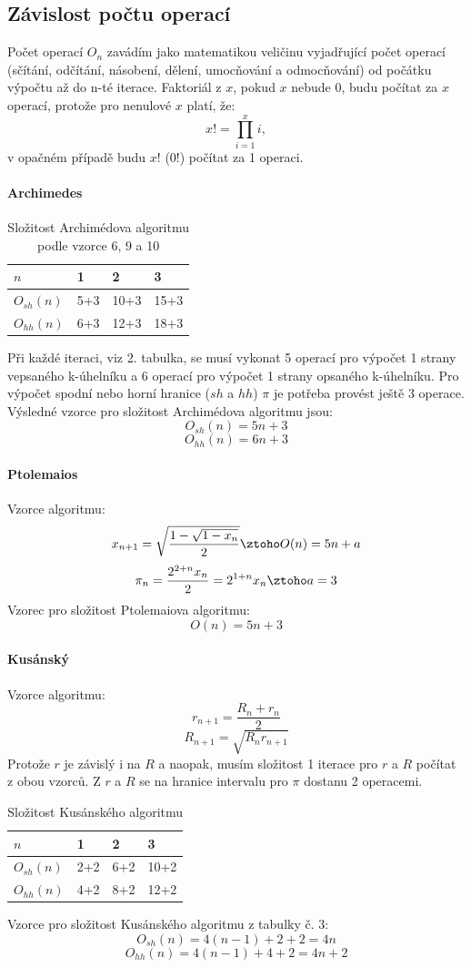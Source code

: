 \documentclass[rocnikovka]{gzwroc} %
\begin{document}
\subsection{Závislost počtu operací}
Počet operací $O_n$ zavádím jako matematikou veličinu vyjadřující počet operací (sčítání, odčítání, násobení, dělení, umocňování a odmocňování) od počátku výpočtu až do n-té iterace. Faktoriál z $x$, pokud $x$ nebude 0, budu počítat za $x$ operací, protože pro nenulové $x$ platí, že:
$$
x!=\prod_{i=1}^{x} i,
$$
v opačném případě budu $x!$ (0!) počítat za 1 operaci.
\paragraph{Archimedes}
\begin{table}[h!]
\caption{Složitost Archimédova algoritmu podle vzorce 6, 9 a 10}
\begin{tabular}{|l||l|l|l|}
\hline
$n$ & 1&2&3 \\ \hline
$O_{sh}(n)$&5+3&10+3&15+3 \\ \hline
$O_{hh}(n)$&6+3&12+3&18+3 \\ \hline
\end{tabular}
\end{table}
Při každé iteraci, viz 2. tabulka, se musí vykonat 5 operací pro výpočet 1 strany vepsaného k-úhelníku a 6 operací pro výpočet 1 strany opsaného k-úhelníku. Pro výpočet spodní nebo horní hranice ($sh$ a $hh$) $\pi$ je potřeba provést ještě 3 operace. Výsledné vzorce pro složitost Archimédova algoritmu jsou:
$$
O_{sh}(n)=5n+3
$$
$$
O_{hh}(n)=6n+3
$$
\paragraph{Ptolemaios}
Vzorce algoritmu:
$$
x_{n+1}=\sqrt{\frac{1-\sqrt{1-x_n}}{2}} \ztoho O(n)=5n+a
$$
$$
\pi_n=\frac{2^{2+n}x_n}{2}=2^{1+n}x_n \ztoho a=3
$$
Vzorec pro složitost Ptolemaiova algoritmu:
$$
O(n)=5n+3
$$
\paragraph{Kusánský}
Vzorce algoritmu:
$$
r_{n+1}=\frac{R_n+r_n}{2}
$$
$$
R_{n+1}=\sqrt{R_nr_{n+1}}
$$
Protože $r$ je závislý i na $R$ a naopak, musím složitost 1 iterace pro $r$ a $R$ počítat z obou vzorců.  Z $r$ a $R$ se na hranice intervalu pro $\pi$ dostanu 2 operacemi.
\begin{table}[h!]
\caption{Složitost Kusánského algoritmu}
\begin{tabular}{|l||l|l|l|}
\hline
$n$ & 1&2&3 \\ \hline
$O_{sh}(n)$&2+2&6+2&10+2 \\ \hline
$O_{hh}(n)$&4+2&8+2&12+2 \\ \hline
\end{tabular}
\end{table}
Vzorce pro složitost Kusánského algoritmu z tabulky č. 3:
$$
O_{sh}(n)=4(n-1)+2+2=4n
$$
$$
O_{hh}(n)=4(n-1)+4+2=4n+2
$$
\end{document}
